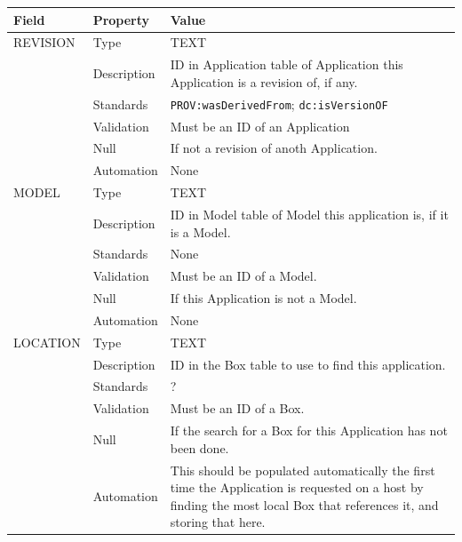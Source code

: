 \begin{longtable}[]{@{}
  >{\raggedright\arraybackslash}p{}
  >{\raggedright\arraybackslash}p{}
  >{\raggedright\arraybackslash}p{}@{}}
\toprule\noalign{}
\begin{minipage}[b]{\linewidth}\raggedright
Field
\end{minipage} & \begin{minipage}[b]{\linewidth}\raggedright
Property
\end{minipage} & \begin{minipage}[b]{\linewidth}\raggedright
Value
\end{minipage} \\
\midrule\noalign{}
\endhead
\bottomrule\noalign{}
\endlastfoot
REVISION & Type & TEXT \\
& Description & ID in Application table of Application this Application
is a revision of, if any. \\
& Standards & \texttt{PROV:wasDerivedFrom}; \texttt{dc:isVersionOF} \\
& Validation & Must be an ID of an Application \\
& Null & If not a revision of anoth Application. \\
& Automation & None \\
MODEL & Type & TEXT \\
& Description & ID in Model table of Model this application is, if it is
a Model. \\
& Standards & None \\
& Validation & Must be an ID of a Model. \\
& Null & If this Application is not a Model. \\
& Automation & None \\
LOCATION & Type & TEXT \\
& Description & ID in the Box table to use to find this application. \\
& Standards & ? \\
& Validation & Must be an ID of a Box. \\
& Null & If the search for a Box for this Application has not been
done. \\
& Automation & This should be populated automatically the first time the
Application is requested on a host by finding the most local Box that
references it, and storing that here. \\
\end{longtable}

